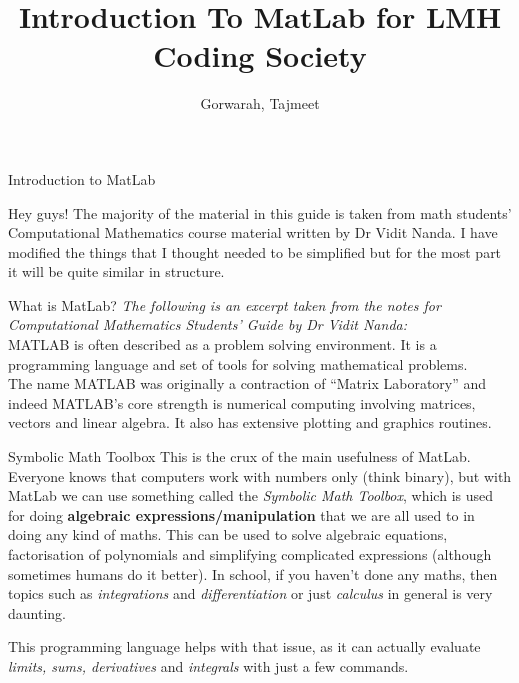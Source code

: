 \documentclass[11pt, oneside]{report}   	%
\title{Introduction To MatLab for LMH Coding Society}
\author{Gorwarah, Tajmeet}
\begin{document}
\maketitle
\begin{chapter}{Introduction to MatLab}

Hey guys! The majority of the material in this guide is taken from math students' Computational Mathematics
course material written by Dr Vidit Nanda. I have modified the things that I thought needed to be simplified but for
the most part it will be quite similar in structure.

\begin{section}{What is MatLab?}
\textit{The following is an excerpt taken from the notes for Computational Mathematics Students' Guide by Dr Vidit
Nanda:}
\\

MATLAB is often described as a problem solving environment. It is a programming language and set of tools for
solving mathematical problems.\\

The name MATLAB was originally a contraction of “Matrix Laboratory” and indeed MATLAB’s core strength is
numerical computing involving matrices, vectors and linear algebra. It also has extensive plotting and graphics
routines.

\begin{subsection}{Symbolic Math Toolbox}
This is the crux of the main usefulness of MatLab. Everyone knows that computers work with numbers only (think
binary), but with MatLab we can use something called the
\textit{Symbolic Math Toolbox}, which is used for doing \textbf{algebraic expressions/manipulation} that we are all
used to in doing any kind of maths. This can be used to
solve algebraic equations, factorisation of polynomials and simplifying complicated expressions (although
sometimes humans do it better). In school, if you haven't done any
maths, then topics such as \textit{integrations} and \textit{differentiation} or just \textit{calculus} in general is very
daunting. 

This programming language helps with that issue, as it can actually evaluate \textit{limits, sums, derivatives} and
\textit{integrals} with just a few commands.


\end{subsection}
\end{section}
\end{chapter}
\end{document}
